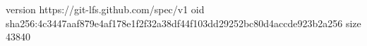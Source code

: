 version https://git-lfs.github.com/spec/v1
oid sha256:4c3447aaf879e4af178e1f2f32a38df44f103dd29252bc80d4accde923b2a256
size 43840
